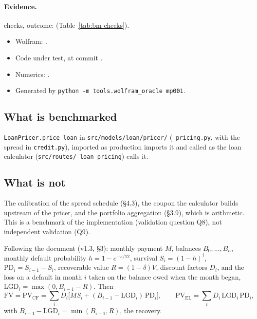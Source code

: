 \documentclass[11pt,a4paper]{article}
\begin{document}
\paragraph{Evidence.} \bmChecks{} checks, outcome: \bmOutcome{}
(Table~\ref{tab:bm-checks}).
\begin{itemize}[leftmargin=*,nosep]
\item Wolfram: \bmWolfram{}\bmWolframVia.
\item Code under test, at commit \bmCodeCommit{}\bmCodeDirty.
\item Numerics: \bmNumerics.
\item Generated \bmGenerated{} by \texttt{python -m tools.wolfram\_oracle mp001}.
\end{itemize}

\mkmpurpose

\subsection{What is benchmarked}
\texttt{LoanPricer.price\_loan} in \texttt{src/models/loan/pricer/} (\texttt{\_pricing.py},
with the spread in \texttt{credit.py}), imported as production imports it and called
as the loan calculator (\texttt{src/routes/\_loan\_pricing}) calls it.

\subsection{What is not}
The calibration of the spread schedule (\S4.3), the coupon the calculator builds
upstream of the pricer, and the portfolio aggregation (\S3.9), which is arithmetic.
This is a benchmark of the implementation (validation question Q8), not independent
validation (Q9).

\mkmframework

Following the document (v1.3, \S3): monthly payment $M$, balances $B_0,\dots,B_n$,
monthly default probability $h=1-e^{-s/12}$, survival $S_i=(1-h)^i$,
$\mathrm{PD}_i=S_{i-1}-S_i$, recoverable value $R=(1-\delta)V$, discount factors $D_i$,
and the loss on a default in month $i$ taken on the balance owed when the month began,
$\mathrm{LGD}_i=\max(0,B_{i-1}-R)$. Then
\begin{equation}
\mathrm{FV}=\mathrm{PV}_{\mathrm{CF}}=\sum_i D_i\bigl[M S_i+(B_{i-1}-\mathrm{LGD}_i)\,\mathrm{PD}_i\bigr],
\qquad
\mathrm{PV}_{\mathrm{EL}}=\sum_i D_i\,\mathrm{LGD}_i\,\mathrm{PD}_i,
\end{equation}
with $B_{i-1}-\mathrm{LGD}_i=\min(B_{i-1},R)$, the recovery.
\end{document}
